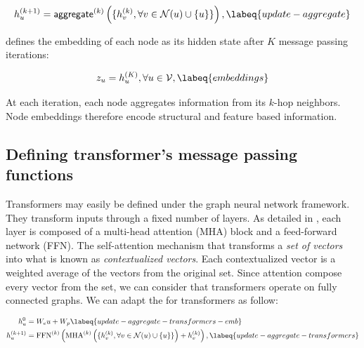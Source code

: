 \begin{equation}
    h^{(k+1)}_u = \mathsf{aggregate}^{(k)}\left(\{h_v^{(k)}, \forall v \in \mathcal{N}(u) \cup \{u\}\}\right), \labeq{update-aggregate}\\
\end{equation}

 defines the embedding of each node as its hidden state after $K$ message passing iterations:

\begin{equation}
    z_u = h_u^{(K)}, \forall u \in \mathcal{V}, \labeq{embeddings}\\
\end{equation}

At each iteration, each node aggregates information from its $k$-hop neighbors. Node embeddings therefore encode structural and feature based information.

\subsection{Defining transformer's message passing functions}

Transformers \parencite{vaswani_17} may easily be defined under the graph neural network framework. 
They transform inputs through a fixed number of layers.
As detailed in , each layer is composed of a multi-head attention (MHA) block and a feed-forward network (FFN).
The self-attention mechanism that transforms a \textit{set of vectors} into what is known as \textit{contextualized vectors}. 
Each contextualized vector is a weighted average of the vectors from the original set.
Since attention compose every vector from the set, we can consider that transformers operate on fully connected graphs.
We can adapt the  for transformers as follow:

\begin{align}
    h^0_u &= W_e u + W_p \labeq{update-aggregate-transformers-emb}\\
    h^{(k+1)}_u &= \text{FFN}^{(k)}\left(\text{MHA}^{(k)}\left(\{h_v^{(k)}, \forall v \in \mathcal{N}(u) \cup \{u\}\}\right) + h_v^{(k)}\right), \labeq{update-aggregate-transformers}
\end{align}

